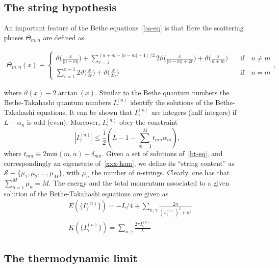 \documentclass[twocolumn,superscriptaddress,prb,10pt]{revtex4-1}
\begin{document}
\subsection{The string hypothesis}

An important feature of the Bethe equations~\eqref{ba-eq} is that Here the scattering phases $\Theta_{m,n}$ are defined as 
%
\begin{widetext}
\begin{eqnarray}
\nonumber\Theta_{m,n}(x)\equiv\left\{\begin{array}{cc}
\vartheta\big(\frac{x}{|n-m|}\big)+\!\!\!\!\!\sum
\limits_{r=1}^{(n+m-|n-m|-1)/2}\!\!\!\!\!2\vartheta\big(\frac{x}
{|n-m|+2r}\big)+\vartheta\big(\frac{x}{n+m}\big) & \quad\mbox{if}
\quad n\ne m\\\sum\limits_{r=1}^{n-1}2\vartheta\big(\frac{x}{2r}\big)+
\vartheta\big(\frac{x}{2n}\big) & \quad\mbox{if}\quad n=m
\end{array}\right.,
\end{eqnarray}
\end{widetext}
%
where $\vartheta(x)\equiv 2\arctan(x)$. Similar to the Bethe quantum numbers 
the Bethe-Takahashi quantum numbers $I_{\gamma}^{(n)}$ identify the solutions 
of the Bethe-Takahashi equations. It can be shown that $I_\gamma^{(n)}$ are 
integers (half integers) if $L-\alpha_n$ is odd (even). Moreover, 
$I_\gamma^{(n)}$ obey the constraint 
%
\begin{equation}
\label{bt-bounds}
|I_\gamma^{(n)}|\le\frac{1}{2}(L-1-\sum\limits_{m=1}^Mt_{mn}\alpha_m),
\end{equation}
%
where $t_{mn}\equiv 2\textrm{min}(m,n)-\delta_{mn}$. 
Given a set of solutions of~\eqref{bt-eq}, and correspondingly an eigenstate 
of~\eqref{xxx-ham}, we define its ``string content'' as ${\mathcal S}\equiv
\{\mu_1,\mu_2,\dots,\mu_M\}$, with $\mu_n$ the number of $n$-strings. Clearly, 
one has that $\sum_{n=1}^M\mu_n=M$. The energy and the total momentum 
associated to a given solution of the Bethe-Takahashi equations are given as 
%
\begin{align}
& E(\{I_\gamma^{(n)}\})=-L/4+\sum\limits_{n,\gamma}\frac{2n}{
(x_\gamma^{(n)})^2+n^2}\\
& K(\{I_\gamma^{(n)}\})=\sum\limits_{n,\gamma}\frac{2\pi 
I_\gamma^{(n)}}{L}
\end{align}
%

\subsection{The thermodynamic limit}
\end{document}
